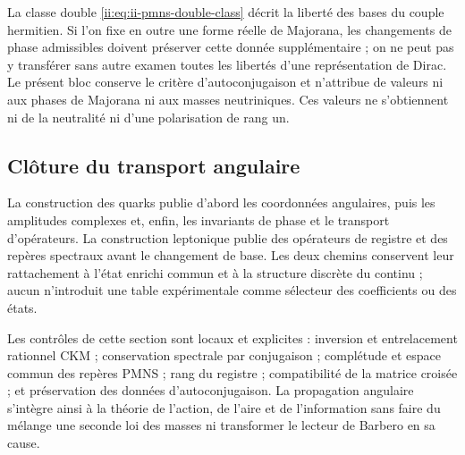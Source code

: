 \begin{remark}
La classe double \eqref{ii:eq:ii-pmns-double-class} décrit la liberté des
bases du couple hermitien. Si l'on fixe en outre une forme réelle de Majorana,
les changements de phase admissibles doivent préserver cette donnée supplémentaire ;
on ne peut pas y transférer sans autre examen toutes les libertés d'une représentation
de Dirac. Le présent bloc conserve le critère d'autoconjugaison et
n'attribue de valeurs ni aux phases de Majorana ni aux masses neutriniques. Ces valeurs
ne s'obtiennent ni de la neutralité ni d'une polarisation de rang un.
\end{remark}

\subsection{Clôture du transport angulaire}

La construction des quarks publie d'abord les coordonnées angulaires, puis
les amplitudes complexes et, enfin, les invariants de phase et le
transport d'opérateurs. La construction leptonique publie des opérateurs de
registre et des repères spectraux avant le changement de base. Les deux chemins
conservent leur rattachement à l'état enrichi commun et à la structure
discrète du continu ; aucun n'introduit une table expérimentale comme
sélecteur des coefficients ou des états.

Les contrôles de cette section sont locaux et explicites : inversion et
entrelacement rationnel CKM ; conservation spectrale par conjugaison ;
complétude et espace commun des repères PMNS ; rang du registre ;
compatibilité de la matrice croisée ; et préservation des données
d'autoconjugaison. La propagation angulaire s'intègre ainsi à la théorie de
l'action, de l'aire et de l'information sans faire du mélange une seconde loi des
masses ni transformer le lecteur de Barbero en sa cause.
